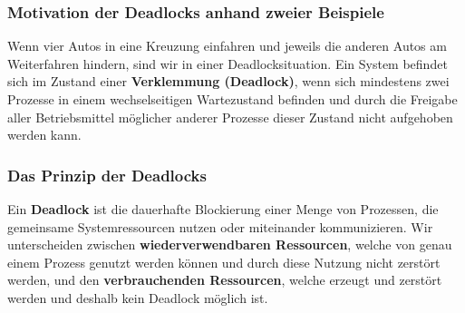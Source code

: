 \documentclass{article}
\begin{document}
\subsubsection{Motivation der Deadlocks anhand zweier Beispiele}
    Wenn vier Autos in eine Kreuzung einfahren und jeweils die anderen Autos am Weiterfahren hindern, sind wir in einer Deadlocksituation.\newline
    Ein System befindet sich im Zustand einer \textbf{Verklemmung (Deadlock)}, wenn sich mindestens zwei Prozesse in einem wechselseitigen Wartezustand befinden und durch die Freigabe aller Betriebsmittel möglicher anderer Prozesse dieser Zustand nicht aufgehoben werden kann. 
\subsubsection{Das Prinzip der Deadlocks}
    Ein \textbf{Deadlock} ist die dauerhafte Blockierung einer Menge von Prozessen, die gemeinsame Systemressourcen nutzen oder miteinander kommunizieren.\newline
    Wir unterscheiden zwischen \textbf{wiederverwendbaren Ressourcen}, welche von genau einem Prozess genutzt werden können und durch diese Nutzung nicht zerstört werden, und den \textbf{verbrauchenden Ressourcen}, welche erzeugt und zerstört werden und deshalb kein Deadlock möglich ist.
\end{document}
